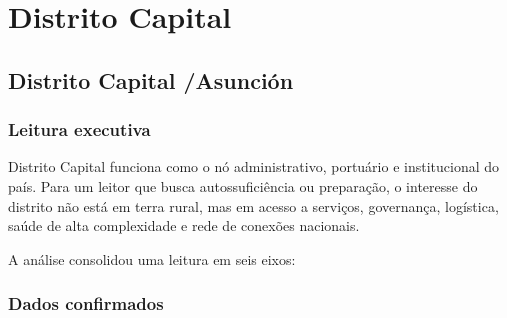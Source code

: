 \chapter{Distrito Capital}\label{dept:Distrito Capital}
\vfill\clearpage
\section{Distrito Capital /\allowbreak \allowbreak  Asunción}

\subsection{Leitura executiva}

Distrito Capital funciona como o nó administrativo, portuário e
institucional do país. Para um leitor que busca autossuficiência ou
preparação, o interesse do distrito não está em terra rural, mas em
acesso a serviços, governança, logística, saúde de alta complexidade e
rede de conexões nacionais.

A análise consolidou uma leitura em seis eixos:

\subsection{Dados confirmados}

